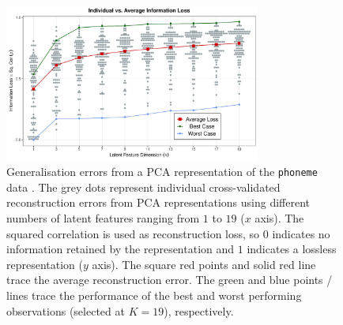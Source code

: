 \begin{figure}
    \centering
    \includegraphics[width=0.75\textwidth]{figures/info-loss.pdf}
    \caption{Generalisation errors from a PCA representation of the \texttt{phoneme} data \parencite{hastie_elements_2009}. The grey dots represent individual cross-validated reconstruction errors from PCA representations using different numbers of latent features ranging from $1$ to $19$ ($x$ axis). 
    The squared correlation is used as reconstruction loss, so $0$ indicates no information retained by the representation and $1$ indicates a lossless representation ($y$ axis).
    The square red points and solid red line trace the average reconstruction error. The green and blue points / lines trace the performance of the best and worst performing observations (selected at $K=19$), respectively.}
    \label{fig:ind-losses}
\end{figure}


